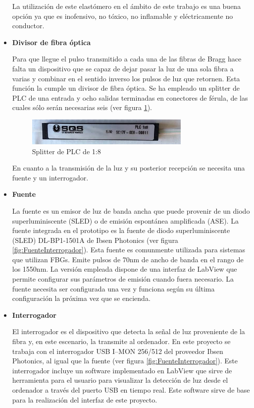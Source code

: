 \begin{itemize}
	La utilización de este elastómero en el ámbito de este trabajo es una buena opción ya que es inofensivo, no tóxico, no inflamable y eléctricamente no conductor.\cite{nedomaPDMS}
	



\item \textbf{Divisor de fibra óptica}

Para que llegue el pulso transmitido a cada una de las fibras de Bragg hace falta un dispositivo que se capaz de dejar pasar la luz de una sola fibra a varias y combinar en el sentido inverso los pulsos de luz que retornen. Esta función la cumple un divisor de fibra óptica. Se ha empleado un splitter de PLC de una entrada y ocho salidas terminadas en conectores de férula, de las cuales sólo serán necesarias seis (ver figura \ref{fig:splitter}).

\begin{figure}[H]
	\centering
	\includegraphics[width=0.75\textwidth]{./img/splitter1a8}
	\caption{Splitter de PLC de 1:8} \label{fig:splitter}
\end{figure}

En cuanto a la transmisión de la luz y su posterior recepción se necesita una fuente y un interrogador. 

\item \textbf{Fuente}

La fuente es un emisor de luz de banda ancha que puede provenir de un diodo superluminiscente (SLED) o de emisión espontánea amplificada (ASE).  La fuente integrada en el prototipo es la fuente de diodo superluminiscente (SLED) DL-BP1-1501A de Ibsen Photonics (ver figura \ref{fig:FuenteInterrogador}). Esta fuente es comunmente utilizada para sistemas que utilizan FBGs. Emite pulsos de 70nm de ancho de banda en el rango de los 1550nm. La versión empleada dispone de una interfaz de LabView que permite configurar sus parámetros de emisión cuando fuera necesario. La fuente necesita ser configurada una vez y funciona según su última configuración la próxima vez que se encienda. 


\item \textbf{Interrogador}


El interrogador es el dispositivo que detecta la señal de luz proveniente de la fibra y, en este escenario, la transmite al ordenador. En este proyecto se trabaja con el interrogador USB I–MON 256/512 del proveedor Ibsen Photonics, al igual que la fuente (ver figura \ref{fig:FuenteInterrogador}). Este interrogador incluye un software implementado en LabView que sirve de herramienta para el usuario para visualizar la detección de luz desde el ordenador a través del puerto USB en tiempo real.  Este software sirve de base para la realización del interfaz de este proyecto. 


\end{itemize}
